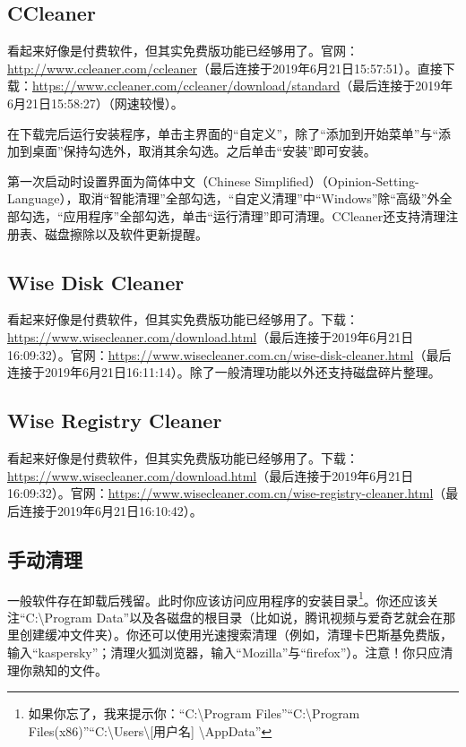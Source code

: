\subsection{CCleaner}
看起来好像是付费软件，但其实免费版功能已经够用了。官网：\url{http://www.ccleaner.com/ccleaner}（最后连接于2019年6月21日15:57:51）。直接下载：\url{https://www.ccleaner.com/ccleaner/download/standard}（最后连接于2019年6月21日15:58:27）（网速较慢）。\par
在下载完后运行安装程序，单击主界面的“自定义”，除了“添加到开始菜单”与“添加到桌面”保持勾选外，取消其余勾选。之后单击“安装”即可安装。\par
第一次启动时设置界面为简体中文（Chinese Simplified）（Opinion-Setting-Language），取消“智能清理”全部勾选，“自定义清理”中“Windows”除“高级”外全部勾选，“应用程序”全部勾选，单击“运行清理”即可清理。CCleaner还支持清理注册表、磁盘擦除以及软件更新提醒。
\subsection{Wise Disk Cleaner}
看起来好像是付费软件，但其实免费版功能已经够用了。下载：\url{https://www.wisecleaner.com/download.html}（最后连接于2019年6月21日16:09:32）。官网：\url{https://www.wisecleaner.com.cn/wise-disk-cleaner.html}（最后连接于2019年6月21日16:11:14）。除了一般清理功能以外还支持磁盘碎片整理。
\subsection{Wise Registry Cleaner}
看起来好像是付费软件，但其实免费版功能已经够用了。下载：\url{https://www.wisecleaner.com/download.html}（最后连接于2019年6月21日16:09:32）。官网：\url{https://www.wisecleaner.com.cn/wise-registry-cleaner.html}（最后连接于2019年6月21日16:10:42）。
\subsection{手动清理}
一般软件存在卸载后残留。此时你应该访问应用程序的安装目录\footnote{如果你忘了，我来提示你：“C:\textbackslash Program Files”“C:\textbackslash Program Files(x86)”“C:\textbackslash Users\textbackslash [用户名] \textbackslash AppData”}。你还应该关注“C:\textbackslash Program Data”以及各磁盘的根目录（比如说，腾讯视频与爱奇艺就会在那里创建缓冲文件夹）。你还可以使用光速搜索清理（例如，清理卡巴斯基免费版，输入“kaspersky”；清理火狐浏览器，输入“Mozilla”与“firefox”）。{\color{red}注意！你只应清理你熟知的文件。}
